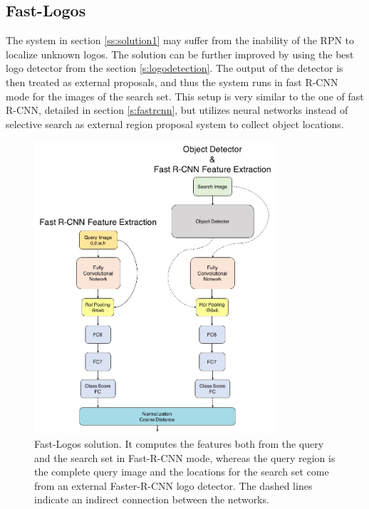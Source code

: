 \subsection{Fast-Logos}\label{ss:solution3}
The system in section \ref{ss:solution1} may suffer from the inability of the RPN to localize unknown logos. The solution can be further improved by using the best logo detector from the section \ref{s:logodetection}.  The output of the detector is then treated as external proposals, and thus the system runs in fast R-CNN mode for the images of the search set. This setup is very similar to the one of fast R-CNN, detailed in section \ref{s:fastrcnn}, but utilizes neural networks instead of selective search as external region proposal system to collect object locations.
\begin{figure}
  \centering
  \includegraphics[width=90mm]{images/mt/sol3_arch.jpg}
  \caption{Fast-Logos solution. It computes the features both from the query and the search set in Fast-R-CNN mode, whereas the query region is the complete query image and the locations for the search set come from an external Faster-R-CNN logo detector. The dashed lines indicate an indirect connection between the networks.}
  \label{f:sol3arch}
\end{figure}
